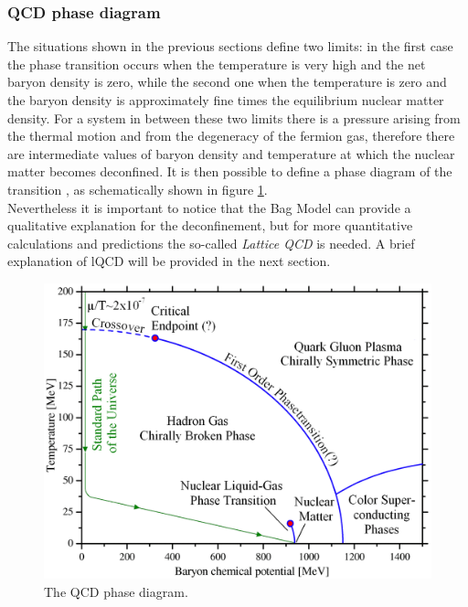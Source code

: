 \documentclass[b5paper,10pt,twoside,oldstyle,classica]{toptesi}
\begin{document}
\subsubsection{QCD phase diagram}
The situations shown in the previous sections define two limits: in the first case the phase transition occurs when the temperature is very high and the net baryon density is zero, while the second one when the temperature is zero and the baryon density is approximately fine times the equilibrium nuclear matter density. For a system in between these two limits there is a pressure arising from the thermal motion and from the degeneracy of the fermion gas, therefore there are intermediate values of baryon density and temperature at which the nuclear matter becomes deconfined. It is then possible to define a phase diagram of the transition \cite{Hands:2001}, as schematically shown in figure \ref{phasediagram}.\\
Nevertheless it is important to notice that the Bag Model can provide a qualitative explanation for the deconfinement, but for more quantitative calculations and predictions the so-called \textit{Lattice QCD} is needed. A brief explanation of lQCD will be provided in the next section.
\begin{figure}[tb]
\begin{center}
\includegraphics[scale = 0.17]{qcd_phasediagram.png}
\caption{The QCD phase diagram.}
\label{phasediagram}
\end{center}
\end{figure}
\end{document}
